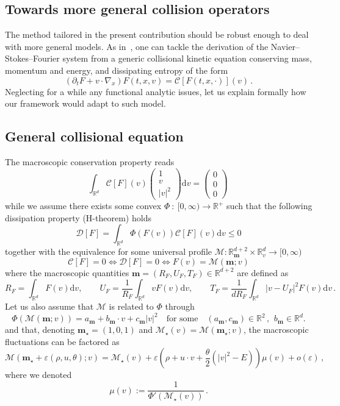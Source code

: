 \documentclass[AHL,Unicode,longabstracts,published]{cedram}
\renewcommand{\d}{\mathrm{d}}
\newcommand{\R}{\mathbb{R}}
\newcommand{\CC}{\mathcal{C}}
\newcommand{\DD}{\mathcal{D}}
\newcommand{\MM}{\mathcal{M}}
\renewcommand*\le{\leqslant}
\newcommand*\eps{{\varepsilon}}
\begin{document}
\subsection{Towards more general collision operators}\label{scn:general_collisions}


The method tailored in the present contribution should be robust enough to deal with more general models. As in~\cite{BaGoLe1}, one can tackle the derivation of the Navier--Stokes--Fourier system from a generic collisional kinetic equation conserving mass, momentum and energy, and dissipating entropy of the form
\begin{equation}\label{eq:Kin-general}
(\partial_t F + v \cdot \nabla_x) F(t, x, v) = \CC[F(t, x, \cdot)](v) \,.
\end{equation}
Neglecting for a while any functional analytic issues, let us explain formally how our framework would adapt to such model.

\subsection*{General collisional equation}
The macroscopic conservation property reads
\[
\int_{\R^d} \CC[F](v) \left(
\begin{array}{c}
1 \\ v \\ |v|^2
\end{array} \right) \d v = \left(
\begin{array}{c}
0 \\ 0 \\ 0
\end{array} \right) \,
\]
while we assume there exists some convex $\Phi\::\:[0,\infty) \to\R^{+}$ such that the following dissipation property (H-theorem) holds
\[
\DD[F] = \int_{ \R^d } \Phi(F(v)) \CC[F](v) \d v \le 0
\]
together with the equivalence for some universal profile $\MM : \R^{d+2}_{\bm m} \times \R^d_v \to [0, \infty)$
\[
\CC[F] = 0 \iff \DD[F] = 0 \iff F(v) = \MM \left({\bm m} ; v \right)
\]
where the macroscopic quantities ${\bm m} = (R_F, U_F, T_F) \in \R^{d+2}$ are defined as
\[
R_F = \int_{ \R^d } F(v) \d v, \qquad U_F = \frac{1}{R_F} \int_{\R^d} v F(v) \d v, \qquad T_F = \frac{1}{d R_F} \int_{ \R^d } |v-U_F|^2 F(v) \d v \,.
\]
Let us also assume that $\MM$ is related to $\Phi$ through
\begin{equation}\label{eq:MMstar}
\Phi(\MM(\bm{m} ; v)) = a_{\bm m} + b_{\bm m} \cdot v + c_{\bm m} | v |^2 \quad \text{for some} \quad (a_{\bm m}, c_{\bm m}) \in \R^{2}\,,\,\:b_{\bm m} \in \R^{d}.
\end{equation}
and that, denoting ${\bm m}_\star = (1,0,1)$ and $\MM_\star(v) = \MM({\bm m}_\star ; v)$, the macroscopic fluctuations can be factored as
\[
\MM\left({\bm m}_\star + \eps (\rho, u, \theta) ; v \right) = \MM_\star(v) + \eps \left(\rho + u \cdot v + \frac{ \theta }{2} \left(|v|^2 - E\right) \right) \mu(v) + o(\eps) \,,
\]
where we denoted
\[
\mu(v) := \frac{1}{ \Phi'(\MM_\star(v)) } \,.
\]
\end{document}
